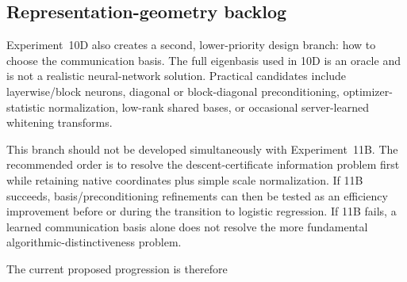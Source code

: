 \subsection{Representation-geometry backlog}

Experiment~10D also creates a second, lower-priority design branch: how to choose the communication basis. The full eigenbasis used in 10D is an oracle and is not a realistic neural-network solution. Practical candidates include layerwise/block neurons, diagonal or block-diagonal preconditioning, optimizer-statistic normalization, low-rank shared bases, or occasional server-learned whitening transforms.

This branch should not be developed simultaneously with Experiment~11B. The recommended order is to resolve the descent-certificate information problem first while retaining native coordinates plus simple scale normalization. If 11B succeeds, basis/preconditioning refinements can then be tested as an efficiency improvement before or during the transition to logistic regression. If 11B fails, a learned communication basis alone does not resolve the more fundamental algorithmic-distinctiveness problem.

The current proposed progression is therefore
\begin{center}
\end{center}
